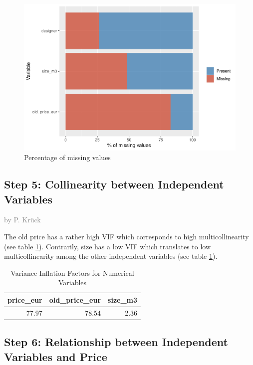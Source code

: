 \documentclass[a4paper, nobind]{templates/ociamthesis}
\begin{document}
\begin{figure}
\includegraphics[width=1\linewidth]{_main_files/figure-latex/missing-values-1} \caption{Percentage of missing values}\label{fig:missing-values}
\end{figure}

\hypertarget{collinearity}{%
\subsection{Step 5: Collinearity between Independent Variables}\label{collinearity}}

\textcolor{gray}{by P. Krück}

The old price has a rather high VIF which corresponds to high multicollinearity (see table \ref{tab:vif}). Contrarily, size has a low VIF which translates to low multicollinearity among the other independent variables (see table \ref{tab:vif}).

\begin{table}

\caption{\label{tab:vif}Variance Inflation Factors for Numerical Variables}
\centering
\begin{tabular}[t]{r|r|r}
\hline
price\_eur & old\_price\_eur & size\_m3\\
\hline
77.97 & 78.54 & 2.36\\
\hline
\end{tabular}
\end{table}

\hypertarget{relationship}{%
\subsection{Step 6: Relationship between Independent Variables and Price}\label{relationship}}
\end{document}
